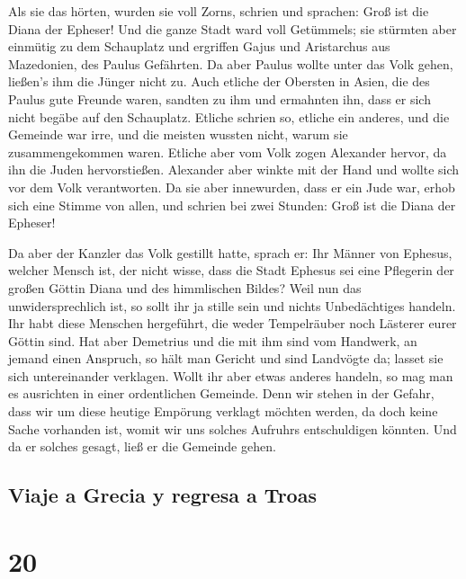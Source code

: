  Als sie das hörten, wurden sie voll Zorns, schrien und
sprachen: Groß ist die Diana der Epheser!  Und die ganze
Stadt ward voll Getümmels; sie stürmten aber einmütig zu dem Schauplatz
und ergriffen Gajus und Aristarchus aus Mazedonien, des Paulus
Gefährten.  Da aber Paulus wollte unter das Volk gehen,
ließen's ihm die Jünger nicht zu.  Auch etliche der
Obersten in Asien, die des Paulus gute Freunde waren, sandten zu ihm und
ermahnten ihn, dass er sich nicht begäbe auf den Schauplatz.
 Etliche schrien so, etliche ein anderes, und die
Gemeinde war irre, und die meisten wussten nicht, warum sie
zusammengekommen waren.  Etliche aber vom Volk zogen
Alexander hervor, da ihn die Juden hervorstießen. Alexander aber winkte
mit der Hand und wollte sich vor dem Volk verantworten. 
Da sie aber innewurden, dass er ein Jude war, erhob sich eine Stimme von
allen, und schrien bei zwei Stunden: Groß ist die Diana der Epheser!

 Da aber der Kanzler das Volk gestillt hatte, sprach er:
Ihr Männer von Ephesus, welcher Mensch ist, der nicht wisse, dass die
Stadt Ephesus sei eine Pflegerin der großen Göttin Diana und des
himmlischen Bildes?  Weil nun das unwidersprechlich ist,
so sollt ihr ja stille sein und nichts Unbedächtiges handeln.
 Ihr habt diese Menschen hergeführt, die weder
Tempelräuber noch Lästerer eurer Göttin sind.  Hat aber
Demetrius und die mit ihm sind vom Handwerk, an jemand einen Anspruch,
so hält man Gericht und sind Landvögte da; lasset sie sich untereinander
verklagen.  Wollt ihr aber etwas anderes handeln, so mag
man es ausrichten in einer ordentlichen Gemeinde.  Denn
wir stehen in der Gefahr, dass wir um diese heutige Empörung verklagt
möchten werden, da doch keine Sache vorhanden ist, womit wir uns solches
Aufruhrs entschuldigen könnten. Und da er solches gesagt, ließ er die
Gemeinde gehen.

\hypertarget{viaje-a-grecia-y-regresa-a-troas}{%
\subsection{Viaje a Grecia y regresa a
Troas}\label{viaje-a-grecia-y-regresa-a-troas}}

\hypertarget{section-19}{%
\section{20}\label{section-19}}

